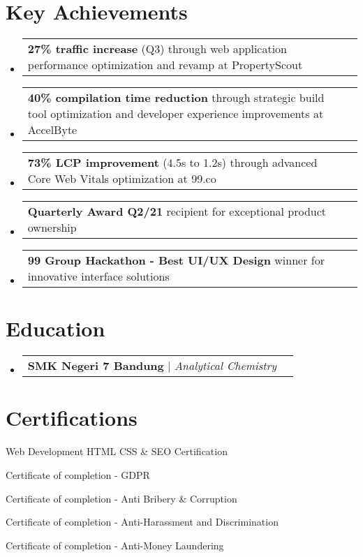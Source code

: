 \documentclass[a4paper, 11pt]{article}
\makeatletter
\newcommand{\resumeProjectHeading}[2]{
    \item
    \begin{tabular*}{0.987\textwidth}{l@{\extracolsep{\fill}}r}
      \small#1\\
    \end{tabular*}\vspace{-7pt}
}
\newcommand{\resumeSubHeadingListStart}{\begin{itemize}[leftmargin=0.1in, label={}]}
\newcommand{\resumeSubHeadingListEnd}{\end{itemize}\vspace{5pt}}
\makeatother
\begin{document}
\section{Key Achievements}
    \resumeSubHeadingListStart
        \resumeProjectHeading
            {\textbf{27\% traffic increase} (Q3) through web application performance optimization and revamp at PropertyScout}{}
        \resumeProjectHeading
            {\textbf{40\% compilation time reduction} through strategic build tool optimization and developer experience improvements at AccelByte}{}
        \resumeProjectHeading
            {\textbf{73\% LCP improvement} (4.5s to 1.2s) through advanced Core Web Vitals optimization at 99.co}{}
        \resumeProjectHeading
            {\textbf{Quarterly Award Q2/21} recipient for exceptional product ownership}{}
        \resumeProjectHeading
            {\textbf{99 Group Hackathon - Best UI/UX Design} winner for innovative interface solutions}{}
    \resumeSubHeadingListEnd

\section{Education}
    \resumeSubHeadingListStart
        \resumeProjectHeading
            {\textbf{SMK Negeri 7 Bandung} $|$ \emph{Analytical Chemistry}}{2009 -- 2011}
    \resumeSubHeadingListEnd

\section{Certifications}
    \resumeSubHeadingListStart
        \small{
            \item Web Development HTML CSS \& SEO Certification
            \item Certificate of completion - GDPR
            \item Certificate of completion - Anti Bribery \& Corruption
            \item Certificate of completion - Anti-Harassment and Discrimination
            \item Certificate of completion - Anti-Money Laundering
        }
    \resumeSubHeadingListEnd

\end{document}
